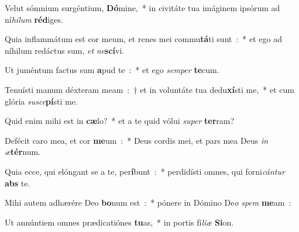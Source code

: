 \item Velut sómnium surgéntium, \textbf{Dó}mine,~* in civitáte tua imáginem ipsórum ad ní\emph{hi}\emph{lum} \textbf{réd}iges.
\item Quia inflammátum est cor meum, et renes mei commu\textbf{tá}ti sunt~:~* et ego ad níhilum redáctus sum, \emph{et} \emph{ne}\textbf{scí}vi.
\item Ut juméntum factus sum \textbf{a}pud te~:~* et ego \emph{sem}\emph{per} \textbf{te}cum.
\item Tenuísti manum déxteram meam~:~† et in voluntáte tua dedu\textbf{xí}sti me,~* et cum glória \emph{sus}\emph{ce}\textbf{pí}sti me.
\item Quid enim mihi est in \textbf{cæ}lo?~* et a te quid vólui \emph{su}\emph{per} \textbf{ter}ram?
\item Defécit caro mea, et cor \textbf{me}um~:~* Deus cordis mei, et pars mea Deus \emph{in} \emph{æ}\textbf{tér}num.
\item Quia ecce, qui elóngant se a te, per\textbf{í}bunt~:~* perdidísti omnes, qui forni\emph{cán}\emph{tur} \textbf{abs} te.
\item Mihi autem adhærére Deo \textbf{bo}num est~:~* pónere in Dómino De\emph{o} \emph{spem} \textbf{me}am~:
\item Ut annúntiem omnes prædicatiónes \textbf{tu}as,~* in portis fí\emph{li}\emph{æ} \textbf{Si}on.